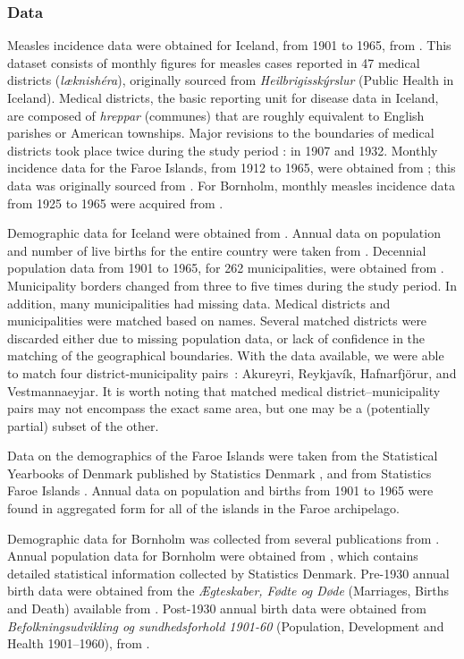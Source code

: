 \documentclass[10pt]{article}
\begin{document}
\subsubsection*{Data}

Measles incidence data were obtained for Iceland, from 1901 to 1965, from \cite{Cliff1981}. This dataset consists of monthly figures for measles cases reported in 47 medical districts (\textit{l\ae knish\'{e}ra\dh{}}), originally sourced from \textit{Heilbrig\dh{}issk\'{y}rslur} (Public Health in Iceland). Medical districts, the basic reporting unit for disease data in Iceland, are composed of \textit{hreppar} (communes) that are roughly equivalent to English parishes or American townships. Major revisions to the boundaries of medical districts took place twice during the study period : in 1907 and 1932. Monthly incidence data for the Faroe Islands, from 1912 to 1965, were obtained from \cite{Cliff2000}; this data was originally sourced from \cite{Lancaster1990}. For Bornholm, monthly measles incidence data from 1925 to 1965 were acquired from \cite{Kingdom}.

Demographic data for Iceland were obtained from \cite{StatsIceland}. Annual data on population and number of live births for the entire country were taken from \cite{StatsIcelandBirths}. Decennial population data from 1901 to 1965, for 262 municipalities, were obtained from \cite{StatsIcelandPop}. Municipality borders changed from three to five times during the study period. In addition, many municipalities had missing data. Medical districts and municipalities were matched based on names. Several matched districts were discarded either due to missing population data, or lack of confidence in the matching of the geographical boundaries. With the data available, we were able to match four district-municipality pairs~: Akureyri, Reykjav\'{i}k, Hafnarfj\"{o}r\dh{}ur, and Vestmannaeyjar. It is worth noting that matched medical district--municipality pairs may not encompass the exact same area, but one may be a (potentially partial) subset of the other. 

Data on the demographics of the Faroe Islands were taken from the Statistical Yearbooks of Denmark published by Statistics Denmark \cite{StatsDenmark}, and from Statistics Faroe Islands \cite{StatsFaroe}. Annual data on population and births from 1901 to 1965 were found in aggregated form for all of the islands in the Faroe archipelago. 

Demographic data for Bornholm was collected from several publications from \cite{StatsDenmark}. Annual population data for Bornholm were obtained from \cite{StatsDenmarkPop}, which contains detailed statistical information collected by Statistics Denmark. Pre-1930 annual birth data were obtained from the \textit{\AE{}gteskaber, F\o{}dte og D\o{}de} (Marriages, Births and Death) available from \cite{StatsDenmarkBirths1}. Post-1930 annual birth data were obtained from \textit{Befolkningsudvikling og sundhedsforhold 1901-60} (Population, Development and Health 1901--1960), from \cite{StatsDenmarkBirths2}.
\end{document}
